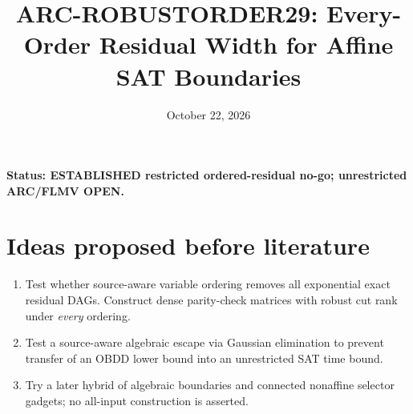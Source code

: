 \documentclass[11pt]{article}
\title{ARC-ROBUSTORDER29: Every-Order Residual Width for Affine SAT Boundaries}
\date{October 22, 2026}
\begin{document}
\maketitle
\noindent\textbf{Status: ESTABLISHED restricted ordered-residual no-go; unrestricted ARC/FLMV OPEN.}
\section*{Ideas proposed before literature}
\begin{enumerate}
\item Test whether source-aware variable ordering removes all exponential exact residual DAGs. Construct dense parity-check matrices with robust cut rank under \emph{every} ordering.
\item Test a source-aware algebraic escape via Gaussian elimination to prevent transfer of an OBDD lower bound into an unrestricted SAT time bound.
\item Try a later hybrid of algebraic boundaries and connected nonaffine selector gadgets; no all-input construction is asserted.
\end{enumerate}
\end{document}
